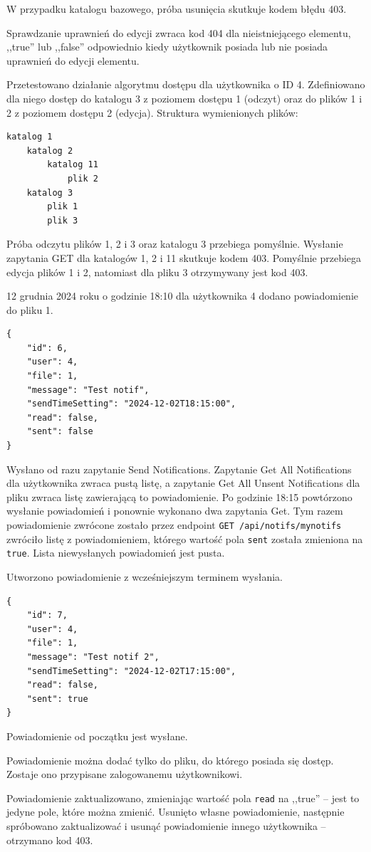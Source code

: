 \documentclass[a4paper,twoside,12pt]{book}
\begin{document}
W przypadku katalogu bazowego, próba usunięcia skutkuje kodem błędu 403.

Sprawdzanie uprawnień do edycji zwraca kod 404 dla nieistniejącego elementu, ,,true'' lub ,,false'' odpowiednio kiedy użytkownik posiada lub nie posiada uprawnień do edycji elementu.

Przetestowano działanie algorytmu dostępu dla użytkownika o ID 4. Zdefiniowano dla niego dostęp do katalogu 3 z poziomem dostępu 1 (odczyt) oraz do plików 1 i 2 z poziomem dostępu 2 (edycja). Struktura wymienionych plików:
\begin{verbatim}
katalog 1
	katalog 2
		katalog 11
			plik 2
	katalog 3
		plik 1
		plik 3
\end{verbatim}
Próba odczytu plików 1, 2 i 3 oraz katalogu 3 przebiega pomyślnie. Wysłanie zapytania GET dla katalogów 1, 2 i 11 skutkuje kodem 403. Pomyślnie przebiega edycja plików 1 i 2, natomiast dla pliku 3 otrzymywany jest kod 403.

12 grudnia 2024 roku o godzinie 18:10 dla użytkownika 4 dodano powiadomienie do pliku 1. 
\begin{verbatim}
{
	"id": 6,
	"user": 4,
	"file": 1,
	"message": "Test notif",
	"sendTimeSetting": "2024-12-02T18:15:00",
	"read": false,
	"sent": false
}
\end{verbatim}
Wysłano od razu zapytanie Send Notifications. Zapytanie Get All Notifications dla użytkownika zwraca pustą listę, a zapytanie Get All Unsent Notifications dla pliku zwraca listę zawierającą to powiadomienie. Po godzinie 18:15 powtórzono wysłanie powiadomień i ponownie wykonano dwa zapytania Get. Tym razem powiadomienie zwrócone zostało przez endpoint \texttt{GET /api/notifs/mynotifs} zwróciło listę z powiadomieniem, którego wartość pola \texttt{sent} została zmieniona na \texttt{true}. Lista niewysłanych powiadomień jest pusta.

Utworzono powiadomienie z wcześniejszym terminem wysłania.
\begin{verbatim}
{
	"id": 7,
	"user": 4,
	"file": 1,
	"message": "Test notif 2",
	"sendTimeSetting": "2024-12-02T17:15:00",
	"read": false,
	"sent": true
}
\end{verbatim}
Powiadomienie od początku jest wysłane.

Powiadomienie można dodać tylko do pliku, do którego posiada się dostęp. Zostaje ono przypisane zalogowanemu użytkownikowi.

Powiadomienie zaktualizowano, zmieniając wartość pola \texttt{read} na ,,true'' -- jest to jedyne pole, które można zmienić. Usunięto własne powiadomienie, następnie spróbowano zaktualizować i usunąć powiadomienie innego użytkownika -- otrzymano kod 403.
\end{document}
